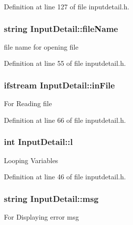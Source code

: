 \-Definition at line 127 of file inputdetail.\-h.

\hypertarget{classInputDetail_a4a7fb27e52bed0f40de143634f2c486b}{
\subsubsection[{file\-Name}]{\setlength{\rightskip}{0pt plus 5cm}string {\bf \-Input\-Detail\-::file\-Name}}}\label{classInputDetail_a4a7fb27e52bed0f40de143634f2c486b}
file name for opening file 

\-Definition at line 55 of file inputdetail.\-h.

\hypertarget{classInputDetail_a4c62c1934fbfcdcc8e2afaee44a87c15}{
\subsubsection[{in\-File}]{\setlength{\rightskip}{0pt plus 5cm}ifstream {\bf \-Input\-Detail\-::in\-File}}}\label{classInputDetail_a4c62c1934fbfcdcc8e2afaee44a87c15}
\-For \-Reading file 

\-Definition at line 66 of file inputdetail.\-h.

\hypertarget{classInputDetail_a3a950727518c2f6ed3c068125a037b9e}{
\subsubsection[{l}]{\setlength{\rightskip}{0pt plus 5cm}int {\bf \-Input\-Detail\-::l}}}\label{classInputDetail_a3a950727518c2f6ed3c068125a037b9e}
\-Looping \-Variables 

\-Definition at line 46 of file inputdetail.\-h.

\hypertarget{classInputDetail_a1abb16cd695678c3fa05e3c812823fee}{
\subsubsection[{msg}]{\setlength{\rightskip}{0pt plus 5cm}string {\bf \-Input\-Detail\-::msg}}}\label{classInputDetail_a1abb16cd695678c3fa05e3c812823fee}
\-For \-Displaying error msg 

